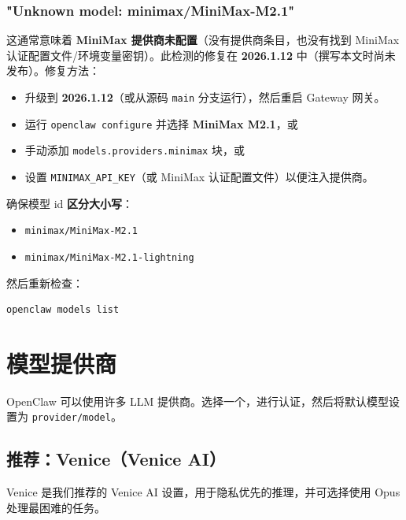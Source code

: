 \subsubsection{"Unknown model: minimax/MiniMax-M2.1"}


这通常意味着 \textbf{MiniMax 提供商未配置}（没有提供商条目，也没有找到 MiniMax 认证配置文件/环境变量密钥）。此检测的修复在 \textbf{2026.1.12} 中（撰写本文时尚未发布）。修复方法：

\begin{itemize}
  \item 升级到 \textbf{2026.1.12}（或从源码 \texttt{main} 分支运行），然后重启 Gateway 网关。
  \item 运行 \texttt{openclaw configure} 并选择 \textbf{MiniMax M2.1}，或
  \item 手动添加 \texttt{models.providers.minimax} 块，或
  \item 设置 \texttt{MINIMAX\_API\_KEY}（或 MiniMax 认证配置文件）以便注入提供商。
\end{itemize}


确保模型 id \textbf{区分大小写}：

\begin{itemize}
  \item \texttt{minimax/MiniMax-M2.1}
  \item \texttt{minimax/MiniMax-M2.1-lightning}
\end{itemize}


然后重新检查：

\begin{lstlisting}[language=bash]
openclaw models list
\end{lstlisting}



\clearpage

\section{模型提供商}


OpenClaw 可以使用许多 LLM 提供商。选择一个，进行认证，然后将默认模型设置为 \texttt{provider/model}。

\subsection{推荐：Venice（Venice AI）}


Venice 是我们推荐的 Venice AI 设置，用于隐私优先的推理，并可选择使用 Opus 处理最困难的任务。

